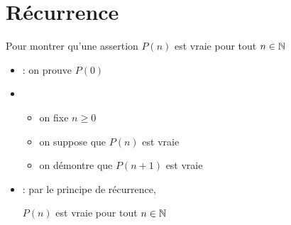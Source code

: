 \section{Récurrence}

\begin{frame}
  

Pour montrer qu'une assertion $P(n)$ est vraie pour tout $n \in \mathbb{N}$

\pause
\bigskip


\begin{itemize}
  \item {}: on prouve $P(0)$

\pause

  \item {}
  \begin{itemize}
    \item on fixe $n\ge 0$
    \item on suppose que $P(n)$ est vraie
    \item on démontre que $P(n+1)$ est vraie
   \end{itemize}

\pause

  \item {} : par le principe de récurrence,

$P(n)$ est vraie pour tout $n\in\mathbb{N}$

\end{itemize}

\end{frame}



